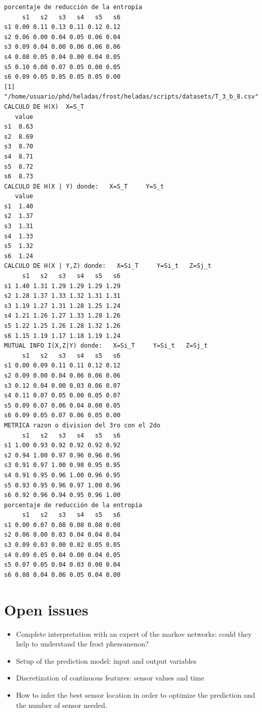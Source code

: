 \documentclass[final,a4paper]{llncs}
\begin{document}
\begin{verbatim}
porcentaje de reducción de la entropía 
     s1   s2   s3   s4   s5   s6
s1 0.00 0.11 0.13 0.11 0.12 0.12
s2 0.06 0.00 0.04 0.05 0.06 0.04
s3 0.09 0.04 0.00 0.06 0.06 0.06
s4 0.08 0.05 0.04 0.00 0.04 0.05
s5 0.10 0.08 0.07 0.05 0.00 0.05
s6 0.09 0.05 0.05 0.05 0.05 0.00
[1] "/home/usuario/phd/heladas/frost/heladas/scripts/datasets/T_3_b_8.csv"
CALCULO DE H(X)  X=S_T 
   value
s1  8.63
s2  8.69
s3  8.70
s4  8.71
s5  8.72
s6  8.73
CALCULO DE H(X | Y) donde:   X=S_T     Y=S_t 
   value
s1  1.40
s2  1.37
s3  1.31
s4  1.33
s5  1.32
s6  1.24
CALCULO DE H(X | Y,Z) donde:   X=Si_T     Y=Si_t   Z=Sj_t
     s1   s2   s3   s4   s5   s6
s1 1.40 1.31 1.29 1.29 1.29 1.29
s2 1.28 1.37 1.33 1.32 1.31 1.31
s3 1.19 1.27 1.31 1.28 1.25 1.24
s4 1.21 1.26 1.27 1.33 1.28 1.26
s5 1.22 1.25 1.26 1.28 1.32 1.26
s6 1.15 1.19 1.17 1.18 1.19 1.24
MUTUAL INFO I(X,Z|Y) donde:   X=Si_T     Y=Si_t   Z=Sj_t
     s1   s2   s3   s4   s5   s6
s1 0.00 0.09 0.11 0.11 0.12 0.12
s2 0.09 0.00 0.04 0.06 0.06 0.06
s3 0.12 0.04 0.00 0.03 0.06 0.07
s4 0.11 0.07 0.05 0.00 0.05 0.07
s5 0.09 0.07 0.06 0.04 0.00 0.05
s6 0.09 0.05 0.07 0.06 0.05 0.00
METRICA razon o division del 3ro con el 2do 
     s1   s2   s3   s4   s5   s6
s1 1.00 0.93 0.92 0.92 0.92 0.92
s2 0.94 1.00 0.97 0.96 0.96 0.96
s3 0.91 0.97 1.00 0.98 0.95 0.95
s4 0.91 0.95 0.96 1.00 0.96 0.95
s5 0.93 0.95 0.96 0.97 1.00 0.96
s6 0.92 0.96 0.94 0.95 0.96 1.00
porcentaje de reducción de la entropía 
     s1   s2   s3   s4   s5   s6
s1 0.00 0.07 0.08 0.08 0.08 0.08
s2 0.06 0.00 0.03 0.04 0.04 0.04
s3 0.09 0.03 0.00 0.02 0.05 0.05
s4 0.09 0.05 0.04 0.00 0.04 0.05
s5 0.07 0.05 0.04 0.03 0.00 0.04
s6 0.08 0.04 0.06 0.05 0.04 0.00
\end{verbatim}
\section{Open issues}

\begin{itemize}
\item Complete interpretation with an expert of the markov networks: could they help 
to understand the frost phenomenon?
\item Setup of the prediction model: input and output variables
\item Discretization of continuous features: sensor values and time
\item How to infer the best sensor location in order to optimize the prediction
and the number of sensor needed.
\end{itemize}
\end{document}

